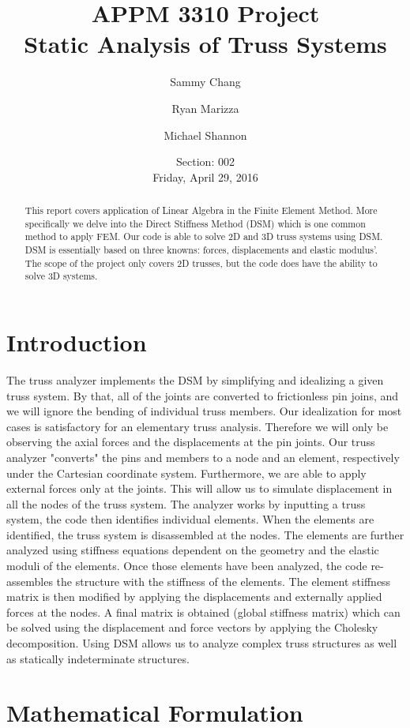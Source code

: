 \documentclass{article}
\title{APPM 3310 Project\\\Large{Static Analysis of Truss Systems}}
\author{Sammy Chang\and{}Ryan Marizza\and{}Michael Shannon}
\date{Section: 002\\\vspace{1em}Friday, April 29, 2016}
\begin{document}
\maketitle


\begin{abstract}
This report covers application of Linear Algebra in the Finite Element Method.
More specifically we delve into the Direct Stiffness Method (DSM) which is one
common method to apply FEM. Our code is able to solve 2D and 3D truss systems
using DSM. DSM is essentially based on three knowns: forces, displacements and
elastic modulus'. The scope of the project only covers 2D trusses, but the
code does have the ability to solve 3D systems.
\end{abstract}




\section{Introduction}
The truss analyzer implements the DSM by simplifying and idealizing a given
truss system. By that, all of the joints are converted to frictionless pin
joins, and we will ignore the bending of individual truss members. Our
idealization for most cases is satisfactory for an elementary truss analysis.
Therefore we will only be observing the axial forces and the displacements at
the pin joints. Our truss analyzer "converts" the pins and members to a node
and an element, respectively under the Cartesian coordinate system.
Furthermore, we are able to apply external forces only at the joints. This
will allow us to simulate displacement in all the nodes of the truss system.
The analyzer works by inputting a truss system, the code then identifies
individual elements. When the elements are identified, the truss system is
disassembled at the nodes. The elements are further analyzed using stiffness
equations dependent on the geometry and the elastic moduli of the elements.
Once those elements have been analyzed, the code re-assembles the structure
with the stiffness of the elements. The element stiffness matrix is then
modified by applying the displacements and externally applied forces at the
nodes. A final matrix is obtained (global stiffness matrix) which can be
solved using the displacement and force vectors by applying the Cholesky
decomposition. Using DSM allows us to analyze complex truss structures as well
as statically indeterminate structures.




\section{Mathematical Formulation}
\end{document}
